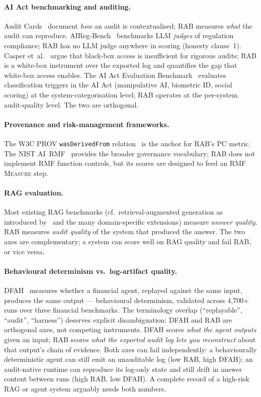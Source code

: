 \documentclass[11pt,a4paper]{article}
\begin{document}
\paragraph{AI Act benchmarking and auditing.} Audit Cards~\cite{staufer2025auditcards} document \emph{how} an audit is contextualised; RAB measures \emph{what} the audit can reproduce. AIReg-Bench~\cite{airegbench2025} benchmarks LLM \emph{judges} of regulation compliance; RAB has no LLM judge anywhere in scoring (honesty clause~1). Casper et~al.~\cite{casper2024blackbox} argue that black-box access is insufficient for rigorous audits; RAB is a white-box instrument over the exported log and quantifies the gap that white-box access enables. The AI Act Evaluation Benchmark~\cite{aiactevalbench2026} evaluates classification triggers in the AI Act (manipulative AI, biometric ID, social scoring) at the system-categorisation level; RAB operates at the per-system audit-quality level. The two are orthogonal.

\paragraph{Provenance and risk-management frameworks.} The W3C PROV \texttt{wasDerivedFrom} relation~\cite{w3cprov2013} is the anchor for RAB's PC metric. The NIST AI~RMF~\cite{nist2023airmf} provides the broader governance vocabulary; RAB does not implement RMF function controls, but its scores are designed to feed an RMF \textsc{Measure} step.

\paragraph{RAG evaluation.} Most existing RAG benchmarks (cf.\ retrieval-augmented generation as introduced by~\cite{lewis2020rag} and the many domain-specific extensions) measure \emph{answer quality}. RAB measures \emph{audit quality} of the system that produced the answer. The two axes are complementary; a system can score well on RAG quality and fail RAB, or vice versa.

\paragraph{Behavioural determinism vs.\ log-artifact quality.} DFAH~\cite{khatchadourian2026dfah} measures whether a financial agent, replayed against the same input, produces the same output --- behavioural determinism, validated across 4{,}700+ runs over three financial benchmarks. The terminology overlap (``replayable'', ``audit'', ``harness'') deserves explicit disambiguation: DFAH and RAB are orthogonal axes, not competing instruments. DFAH scores \emph{what the agent outputs} given an input; RAB scores \emph{what the exported audit log lets you reconstruct} about that output's chain of evidence. Both axes can fail independently: a behaviourally deterministic agent can still emit an unauditable log (low RAB, high DFAH); an audit-native runtime can reproduce its log-only state and still drift in answer content between runs (high RAB, low DFAH). A complete record of a high-risk RAG or agent system arguably needs both numbers.
\end{document}
